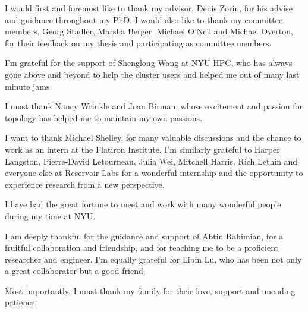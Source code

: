 I would first and foremost like to thank my advisor, Denis Zorin, for his advise and guidance throughout my PhD. I would also like to thank my committee members, Georg Stadler, Marsha Berger, Michael O'Neil and Michael Overton, for their feedback on my thesis and participating as committee members.

I'm grateful for the support of Shenglong Wang at NYU HPC, who has always gone above and beyond to help the cluster users and helped me out of many last minute jams.

I must thank Nancy Wrinkle and Joan Birman, whose excitement and passion for topology has helped me to maintain my own passions.

I want to thank Michael Shelley, for many valuable discussions and the chance to work as an intern at the Flatiron Institute.
I'm similarly grateful to Harper Langston, Pierre-David Letourneau, Julia Wei, Mitchell Harris, Rich Lethin and everyone else at Reservoir Labs for a wonderful internship and the opportunity to experience research from a new perspective.

I have had the great fortune to meet and work with many wonderful people during my time at NYU.

I am deeply thankful for the guidance and support of Abtin Rahimian, for a fruitful collaboration and friendship, and for teaching me to be a proficient researcher and engineer.
I'm equally grateful for Libin Lu, who has been not only a great collaborator but a good friend.

Most importantly, I must thank my family for their love, support and unending patience.
